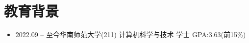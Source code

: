 \section{教育背景}
\begin{normalsize}
  \begin{itemize}[parsep=0.5ex]
    \item {2022.09 -- 至今}\hspace{0.8cm}华南师范大学(211)  \hspace{0.8cm} 计算机科学与技术 \hspace{0.8cm} 学士 \hspace{0.8cm} GPA:3.63(前15\%)
  \end{itemize}
\end{normalsize}